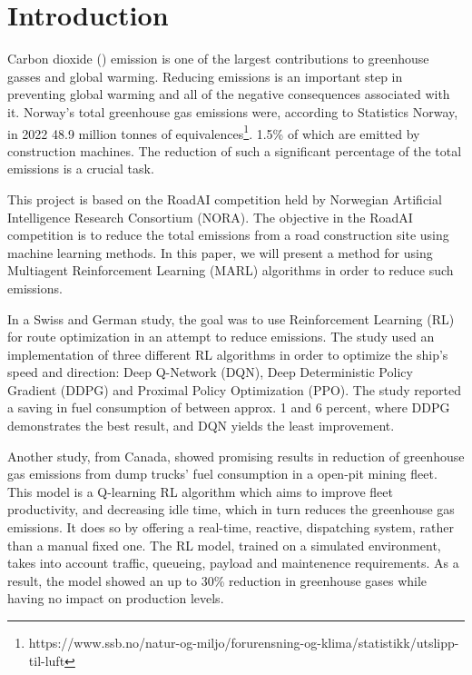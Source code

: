 \documentclass[conference]{IEEEtran}
\begin{document}
  \section{Introduction}
	Carbon dioxide (\coo{}) emission is one of the largest contributions to greenhouse gasses and global warming.
	Reducing \coo{} emissions is an important step in preventing global warming and all of the negative
	consequences associated with it. Norway's total greenhouse gas emissions were, according to Statistics
	Norway, in 2022 48.9 million tonnes of \coo{}
	equivalences\footnote{https://www.ssb.no/natur-og-miljo/forurensning-og-klima/statistikk/utslipp-til-luft}.
	1.5\% of which are emitted by construction machines. \cite{noraRoadAIReducing} The reduction of such
	a significant percentage of the total emissions is a crucial task.

	This project is based on the RoadAI competition held by Norwegian Artificial Intelligence Research
	Consortium (NORA). \cite{noraRoadAIReducing} The objective in the RoadAI competition is to reduce the
	total \coo{} emissions from a road construction site using machine learning methods. In this paper, we will
	present a method for using Multiagent Reinforcement Learning (MARL) algorithms in order to reduce such
	emissions.

  In a Swiss and German study, the goal was to use Reinforcement Learning (RL) for route optimization in
  an attempt to reduce \coo emissions. \cite{MORADI2022111882} The study used an implementation of three
  different RL algorithms in order to optimize the ship's speed and direction: Deep Q-Network (DQN),
  Deep Deterministic Policy Gradient (DDPG) and Proximal Policy Optimization (PPO). The study reported a
  saving in fuel consumption of between approx. 1 and 6 percent, where DDPG demonstrates the best result,
  and DQN yields the least improvement.

	Another study, from Canada, \cite{HUO2023106664} showed promising results in reduction of greenhouse gas
	emissions
	from dump trucks' fuel consumption in a open-pit mining fleet. This model is a Q-learning RL algorithm
	which aims to improve fleet productivity, and decreasing idle time, which in turn reduces the greenhouse
	gas emissions. It does so by offering a real-time, reactive,  dispatching system, rather than a manual
	fixed one. The RL model, trained on a simulated environment, takes into account traffic, queueing,
	payload and maintenence requirements. As a result, the model showed an up to 30\% reduction in greenhouse
	gases while having no impact on production levels.
\end{document}
